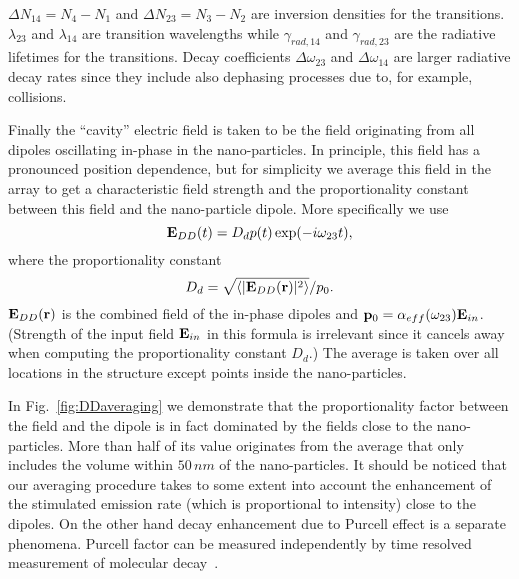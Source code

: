 \documentclass{iopart}
\newcommand{\beq}{\begin{equation}}
\newcommand{\enq}{\end{equation}}
\begin{document}
$\Delta N_{14}=N_4-N_1$ and  $\Delta N_{23}=N_3-N_2$ are inversion densities for the transitions. $\lambda_{23}$ and $\lambda_{14}$ are transition
wavelengths while $\gamma_{rad,14}$ and $\gamma_{rad,23}$ are the radiative
lifetimes for the transitions. Decay coefficients
$\Delta\omega_{23}$ and $\Delta\omega_{14}$ are larger radiative decay rates
since they include also dephasing processes due to, for example, collisions.


Finally the ``cavity'' electric field is taken to be the field originating from all dipoles oscillating in-phase in the nano-particles. In principle,
this field has a pronounced position dependence, but for simplicity we
average this field in the array to get a characteristic field strength
and the proportionality constant between this field and the nano-particle dipole. More specifically we use
\beq
{\bf E}_{DD}(t)=D_d p(t)\exp(-i\omega_{23} t),
\enq
where the proportionality constant 
\beq
D_d=\sqrt{\langle |{\bf E}_{DD}({\bf r})|^2\rangle }/p_0.
\label{eq:DDaverage}
\enq
${\bf E}_{DD}({\bf r})$ is the combined field of the in-phase dipoles and
${\bf p}_0=\alpha_{eff}(\omega_{23}){\bf E}_{in}$. (Strength of the input field
${\bf E}_{in}$ in this formula is irrelevant since it cancels
away when computing the proportionality
constant $D_d$.) The average is taken over all locations in the structure except points inside the nano-particles.

In Fig.~\ref{fig:DDaveraging} we demonstrate that the proportionality factor
between the field and the dipole is in fact dominated by the fields close to
the nano-particles. More than half of its value originates from the average that only includes
the volume within $50\, nm$ of the nano-particles. 
It should be noticed that our averaging procedure takes
to some extent into account the enhancement of the 
stimulated emission rate (which is proportional to intensity)
close to the dipoles. On the other hand decay enhancement 
due to Purcell effect is a separate phenomena. Purcell factor 
can be measured independently by time resolved measurement
of molecular decay~\cite{oulton_plasmon_2009,zhou_lasing_2013,akselrod_probing_2014}.
\end{document}
